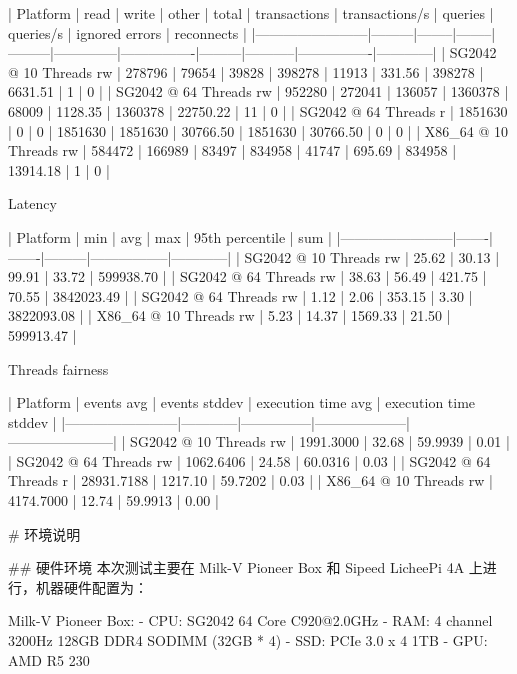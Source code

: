 \documentclass{article}
\begin{document}
\begin{markdown}
| Platform               | read    | write  | other  | total   | transactions | transactions/s | queries | queries/s | ignored errors | reconnects |
|------------------------|---------|--------|--------|---------|--------------|----------------|---------|-----------|----------------|------------|
| SG2042 @ 10 Threads rw | 278796  | 79654  | 39828  | 398278  | 11913        | 331.56         | 398278  | 6631.51   | 1              | 0          |
| SG2042 @ 64 Threads rw | 952280  | 272041 | 136057 | 1360378 | 68009        | 1128.35        | 1360378 | 22750.22  | 11             | 0          |
| SG2042 @ 64 Threads r  | 1851630 | 0      | 0      | 1851630 | 1851630      | 30766.50       | 1851630 | 30766.50  | 0              | 0          |
| X86_64 @ 10 Threads rw | 584472  | 166989 | 83497  | 834958  | 41747        | 695.69         | 834958  | 13914.18  | 1              | 0          |

Latency

| Platform               | min   | avg   | max     | 95th percentile | sum        |
|------------------------|-------|-------|---------|-----------------|------------|
| SG2042 @ 10 Threads rw | 25.62 | 30.13 | 99.91   | 33.72           | 599938.70  |
| SG2042 @ 64 Threads rw | 38.63 | 56.49 | 421.75  | 70.55           | 3842023.49 |
| SG2042 @ 64 Threads rw | 1.12  | 2.06  | 353.15  | 3.30            | 3822093.08 |
| X86_64 @ 10 Threads rw | 5.23  | 14.37 | 1569.33 | 21.50           | 599913.47  |


Threads fairness

| Platform               | events avg | events stddev | execution time avg | execution time stddev |
|------------------------|------------|---------------|--------------------|-----------------------|
| SG2042 @ 10 Threads rw | 1991.3000  | 32.68         | 59.9939            | 0.01                  |
| SG2042 @ 64 Threads rw | 1062.6406  | 24.58         | 60.0316            | 0.03                  |
| SG2042 @ 64 Threads r  | 28931.7188 | 1217.10       | 59.7202            | 0.03                  |
| X86_64 @ 10 Threads rw | 4174.7000  | 12.74         | 59.9913            | 0.00                  |


# 环境说明

## 硬件环境
本次测试主要在 Milk-V Pioneer Box 和 Sipeed LicheePi 4A 上进行，机器硬件配置为：

Milk-V Pioneer Box:
- CPU: SG2042 64 Core C920@2.0GHz
- RAM: 4 channel 3200Hz 128GB DDR4 SODIMM (32GB * 4)
- SSD: PCIe 3.0 x 4 1TB
- GPU: AMD R5 230


\end{markdown}
\end{document}
